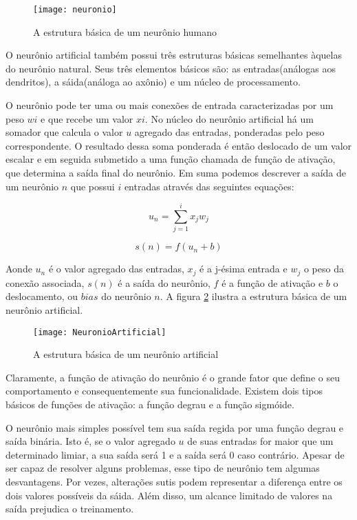 \begin{figure}
\centering
\texttt{[image: neuronio]}
\label{fig:neuronio}
\caption{A estrutura básica de um neurônio humano}
\end{figure}

O neurônio artificial também possui três estruturas básicas semelhantes àquelas do neurônio natural. Seus três elementos básicos são: as entradas(análogas aos dendritos), a sáida(análoga ao axônio) e um núcleo de processamento. 

O neurônio pode ter uma ou mais conexões de entrada caracterizadas por um peso $wi$ e que recebe um valor $xi$. No núcleo do neurônio artificial há um somador que calcula o valor $u$ agregado das entradas, ponderadas pelo peso correspondente. O resultado dessa soma ponderada é então deslocado de um valor escalar e em seguida submetido a uma função chamada de função de ativação, que determina a saída final do neurônio. Em suma podemos descrever a saída de um neurônio $n$ que possui $i$ entradas através das seguintes equações:

\begin{equation}
 u_n = \sum_{j=1}^i x_jw_j
\end{equation}

\begin{equation}
s(n) = f(u_n + b)
\end{equation}

Aonde $u_n$ é o valor agregado das entradas, $x_j$ é a j-ésima entrada e $w_j$ o peso da conexão associada, $s(n)$ é a saída do neurônio, $f$ é a função de ativação e $b$ o deslocamento, ou $bias$ do neurônio $n$. A figura \ref{fig:neuroartificial} ilustra a estrutura básica de um neurônio artificial.

\begin{figure}
\centering
\texttt{[image: NeuronioArtificial]}
\label{fig:neuroartificial}
\caption{A estrutura básica de um neurônio artificial}
\end{figure}

Claramente, a função de ativação do neurônio é o grande fator que define o seu comportamento e consequentemente sua funcionalidade. Existem dois tipos básicos de funções de ativação\cite{Haykin}: a função degrau e a função sigmóide.

O neurônio mais simples possível tem sua saída regida por uma função degrau e saída binária. Isto é, se o valor agregado $u$ de suas entradas for maior que um determinado limiar, a sua saída será 1 e a saída será 0 caso contrário. Apesar de ser capaz de resolver alguns problemas, esse tipo de neurônio tem algumas desvantagens. Por vezes, alterações sutis podem representar a diferença entre os dois valores possíveis da sáida. Além disso, um alcance limitado de valores na saída prejudica o treinamento.

